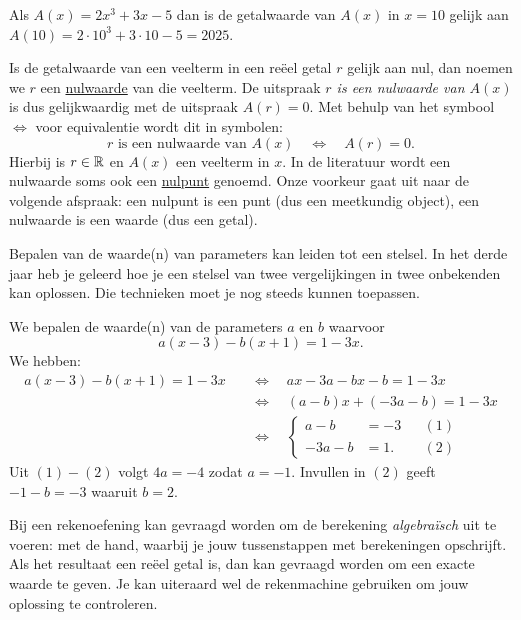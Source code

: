 \documentclass{ximera}
\begin{document}
\begin{example} 
Als $A(x) = 2x^3+3x-5$ dan is de getalwaarde van $A(x)$ in $x = 10$ gelijk aan $A(10) = 2\cdot 10^3 + 3 \cdot 10 - 5 = 2025$.
\end{example} 

Is de getalwaarde van een veelterm in een re\"eel getal $r$ gelijk aan nul, dan noemen we $r$ een \underline{nulwaarde}  van die veelterm. De uitspraak {\em $r$ is een nulwaarde van $A(x)$} is dus gelijkwaardig met de uitspraak {\em $A(r) = 0$}. Met behulp van het symbool $\Leftrightarrow$ voor equivalentie wordt dit in symbolen:
\[
r \text{ is een nulwaarde van } A(x) \quad \Leftrightarrow \quad A(r) = 0.
\]
Hierbij is $r \in \mathbb{R}$ en $A(x)$ een veelterm in $x$. In de literatuur wordt een nulwaarde soms ook een \underline{nulpunt} genoemd. Onze voorkeur gaat uit naar de volgende afspraak: een nulpunt is een punt (dus een meetkundig object), een nulwaarde is een waarde (dus een getal).

Bepalen van de waarde(n) van parameters kan leiden tot een stelsel. 
In het derde jaar heb je geleerd hoe je een stelsel van twee vergelijkingen in twee onbekenden kan oplossen. Die technieken moet je nog steeds kunnen toepassen. 

\begin{example} 
We bepalen de waarde(n) van de parameters $a$ en $b$ waarvoor
\[
a(x-3) - b(x+1) = 1-3x.
\]
We hebben:
\begin{align*}
a(x-3) - b(x+1) = 1-3x \quad 
& \Leftrightarrow \quad ax-3a-bx-b=1-3x \\
& \Leftrightarrow \quad (a-b)x +(-3a-b) = 1-3x \\
& \Leftrightarrow \quad
\left\{
\begin{aligned}
a - b & = -3 && (1)\\
-3a - b & = 1. && (2)
\end{aligned}
\right.
\end{align*}
Uit $(1)-(2)$ volgt $4a = -4$ zodat $a = -1$. Invullen in $(2)$ geeft $-1-b =  -3$ waaruit $b = 2$. 
\end{example} 

Bij een rekenoefening kan gevraagd worden om de berekening {\em algebra\"isch} uit te voeren: met de hand, waarbij je jouw tussenstappen met berekeningen opschrijft. Als het resultaat een re\"eel getal is, dan kan gevraagd worden om een exacte waarde te geven. Je kan uiteraard wel de rekenmachine gebruiken om jouw oplossing te controleren. 
\end{document}

